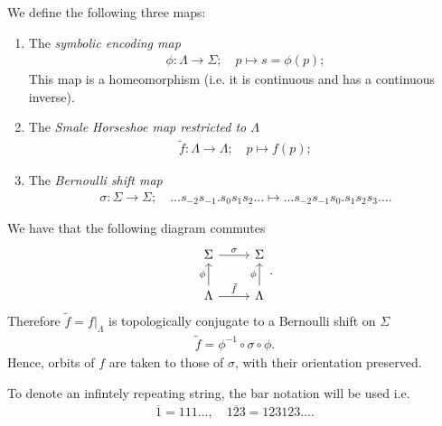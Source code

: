 \begin{definition}
	We define the following three maps:
	\begin{enumerate}
		
\item The \emph{symbolic encoding map}
	\begin{align}
		\boxed{
			\phi:\Lambda \to \Sigma;\quad p \mapsto s= \phi(p);
		}
	\end{align}
	This map is a homeomorphism (i.e. it is continuous and has a continuous inverse).

\item The \emph{Smale Horseshoe map restricted to $\Lambda$}
	\begin{align}
		\boxed{
			\tilde{f}:\Lambda \to \Lambda;\quad p \mapsto f(p);
		}
	\end{align}
\item The \emph{Bernoulli shift map}
	\begin{align}
		\boxed{
			\sigma:\Sigma \to \Sigma;\quad
			\ldots s_{-2} s_{-1} \bm{.} s_0 s_1 s_2 \ldots 
			\mapsto
			\ldots s_{-2}s_{-1}s_{0}\bm{.} s_1 s_2 s_3 \ldots.
		}
	\end{align}
	
	\end{enumerate}
\end{definition}
We have that the following diagram commutes
\begin{equation}
\begin{tikzcd}
	\Sigma \arrow[r, "\sigma"] 
& \Sigma \\
\Lambda \arrow[u,"\phi"] \arrow[r, "\tilde{f}"]
& \Lambda \arrow[u, "\phi"] 
\end{tikzcd}.
\end{equation}
Therefore $\tilde{f} = \left. f\right|_{\Lambda}$ is topologically conjugate to a Bernoulli shift on $\Sigma$ 
	\begin{align}
		\tilde{f} = \phi^{-1} \circ \sigma \circ \phi.
	\end{align}
Hence, orbits of $f$ are taken to those of $\sigma$, with their orientation preserved.	

\begin{remark}[]
	To denote an infintely repeating string, the bar notation will be used i.e.
	\begin{align}
		\overline{1} = 111\ldots,\quad \overline{123}=123123\ldots.
	\end{align}
\end{remark}

